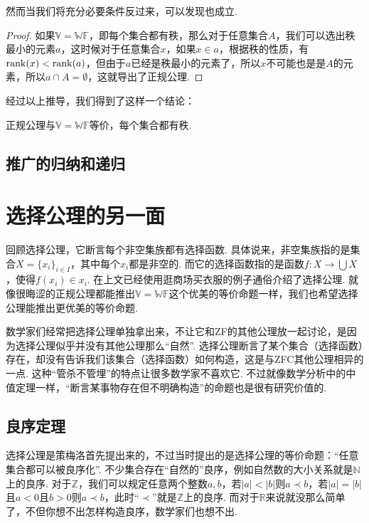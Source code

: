 然而当我们将充分必要条件反过来，可以发现也成立.
\begin{proof}
    如果\(\mathbb{V}=\mathbb{WF}\)，即每个集合都有秩，那么对于任意集合\(A\)，我们可以选出秩最小的元素\(a\)，这时候对于任意集合\(x\)，如果\(x \in a\)，根据秩的性质，有\({\rm rank}(x) < {\rm rank}(a)\)，但由于\(a\)已经是秩最小的元素了，所以\(x\)不可能也是是\(A\)的元素，所以\(a \cap A = \emptyset\)，这就导出了正规公理.
\end{proof}

经过以上推导，我们得到了这样一个结论：
\begin{theorem}{}
    正规公理与\(\mathbb{V}=\mathbb{WF}\)等价，每个集合都有秩.
\end{theorem}



\subsection{推广的归纳和递归}

\section{选择公理的另一面}

回顾选择公理，它断言每个非空集族都有选择函数. 具体说来，非空集族指的是集合\(X = \{x_i\}_{i \in I}\)，其中每个\(x_i\)都是非空的. 而它的选择函数指的是函数\(f:X \to \bigcup X\)，使得\(f(x_i) \in x_i\). 在上文已经使用逛商场买衣服的例子通俗介绍了选择公理. 就像很晦涩的正规公理都能推出\(\mathbb{V} = \mathbb{WF}\)这个优美的等价命题一样，我们也希望选择公理能推出更优美的等价命题.

数学家们经常把选择公理单独拿出来，不让它和\textsf{ZF}的其他公理放一起讨论，是因为选择公理似乎并没有其他公理那么“自然”. 选择公理断言了某个集合（选择函数）存在，却没有告诉我们该集合（选择函数）如何构造，这是与\textsf{ZFC}其他公理相异的一点. 这种“管杀不管埋”的特点让很多数学家不喜欢它. 不过就像数学分析中的中值定理一样，“断言某事物存在但不明确构造”的命题也是很有研究价值的. 

\subsection{良序定理}

选择公理是策梅洛首先提出来的，不过当时提出的是选择公理的等价命题：“任意集合都可以被良序化”. 不少集合存在“自然的”良序，例如自然数的大小关系就是\(\mathbb{N}\)上的良序. 对于\(\mathbb{Z}\)，我们可以规定任意两个整数\(a,b\)，若\(|a|<|b|\)则\(a \prec b\)，若\(|a| = |b|\)且\(a < 0\)且\(b>0\)则\(a \prec b\)，此时“\(\prec\)”就是\(\mathbb{Z}\)上的良序. 而对于\(\mathbb{R}\)来说就没那么简单了，不但你想不出怎样构造良序，数学家们也想不出. 

